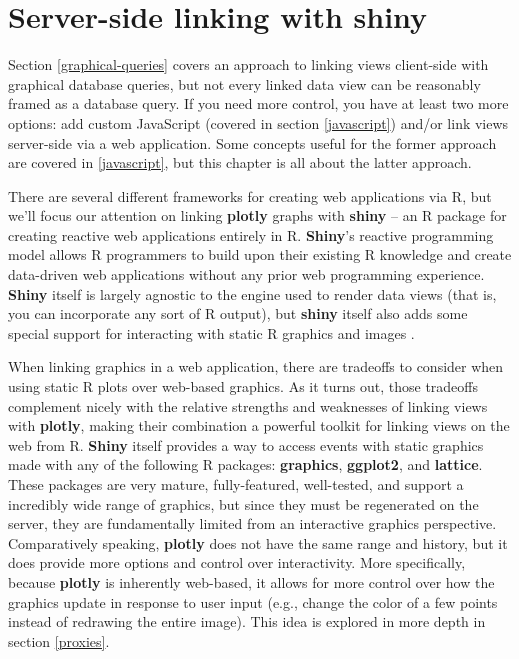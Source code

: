 \documentclass[
  12pt,
]{krantz}
\begin{document}
\hypertarget{linking-server-side}{%
\chapter{Server-side linking with shiny}\label{linking-server-side}}

Section \ref{graphical-queries} covers an approach to linking views client-side with graphical database queries, but not every linked data view can be reasonably framed as a database query. If you need more control, you have at least two more options: add custom JavaScript (covered in section \ref{javascript}) and/or link views server-side via a web application. Some concepts useful for the former approach are covered in \ref{javascript}, but this chapter is all about the latter approach.

There are several different frameworks for creating web applications via R, but we'll focus our attention on linking \textbf{plotly} graphs with \textbf{shiny} -- an R package for creating reactive web applications entirely in R. \textbf{Shiny}'s reactive programming model allows R programmers to build upon their existing R knowledge and create data-driven web applications without any prior web programming experience. \textbf{Shiny} itself is largely agnostic to the engine used to render data views (that is, you can incorporate any sort of R output), but \textbf{shiny} itself also adds some special support for interacting with static R graphics and images \citep{shiny-plot-interaction}.

When linking graphics in a web application, there are tradeoffs to consider when using static R plots over web-based graphics. As it turns out, those tradeoffs complement nicely with the relative strengths and weaknesses of linking views with \textbf{plotly}, making their combination a powerful toolkit for linking views on the web from R. \textbf{Shiny} itself provides a way to access events with static graphics made with any of the following R packages: \textbf{graphics}, \textbf{ggplot2}, and \textbf{lattice}. These packages are very mature, fully-featured, well-tested, and support a incredibly wide range of graphics, but since they must be regenerated on the server, they are fundamentally limited from an interactive graphics perspective. Comparatively speaking, \textbf{plotly} does not have the same range and history, but it does provide more options and control over interactivity. More specifically, because \textbf{plotly} is inherently web-based, it allows for more control over how the graphics update in response to user input (e.g., change the color of a few points instead of redrawing the entire image). This idea is explored in more depth in section \ref{proxies}.
\end{document}
